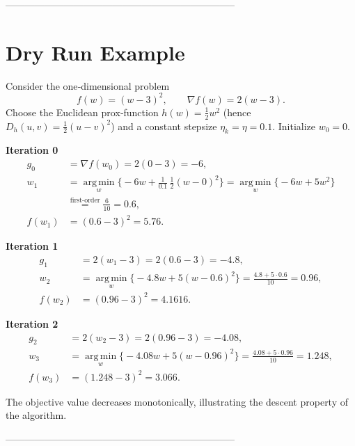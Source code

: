 \documentclass{article}
\newcommand{\argmin}{\operatorname*{arg\,min}}
\newcommand{\grad}{\nabla}
\begin{document}
-----------------------------------------------------------------------

\section*{Dry Run Example}
Consider the one‑dimensional problem 
\[
f(w)=(w-3)^{2},\qquad \grad f(w)=2(w-3).
\]
Choose the Euclidean prox‑function $h(w)=\tfrac12 w^{2}$ (hence $D_h(u,v)=\tfrac12 (u-v)^{2}$) and a constant stepsize $\eta_k=\eta=0.1$.  
Initialize $w_{0}=0$.

\medskip
\textbf{Iteration 0}
\begin{align*}
g_{0}&=\grad f(w_{0})=2(0-3)=-6,\\
w_{1}&=\argmin_{w}\Big\{-6w+\frac{1}{0.1}\,\tfrac12 (w-0)^{2}\Big\}
        =\argmin_{w}\Big\{-6w+5w^{2}\Big\}\\
      &\stackrel{\text{first‑order}}{=}\frac{6}{10}=0.6,\\
f(w_{1})&=(0.6-3)^{2}=5.76.
\end{align*}

\textbf{Iteration 1}
\begin{align*}
g_{1}&=2(w_{1}-3)=2(0.6-3)=-4.8,\\
w_{2}&=\argmin_{w}\Big\{-4.8w+5(w-0.6)^{2}\Big\}
        =\frac{4.8+5\cdot0.6}{10}=0.96,\\
f(w_{2})&=(0.96-3)^{2}=4.1616.
\end{align*}

\textbf{Iteration 2}
\begin{align*}
g_{2}&=2(w_{2}-3)=2(0.96-3)=-4.08,\\
w_{3}&=\argmin_{w}\Big\{-4.08w+5(w-0.96)^{2}\Big\}
        =\frac{4.08+5\cdot0.96}{10}=1.248,\\
f(w_{3})&=(1.248-3)^{2}=3.066.
\end{align*}

The objective value decreases monotonically, illustrating the descent property of the algorithm.

-----------------------------------------------------------------------
\end{document}
